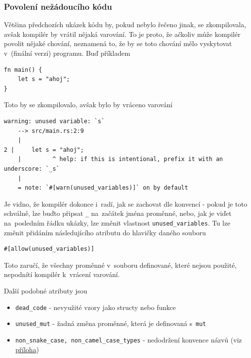 \documentclass[a4paper, 12pt]{article} %
\newcommand{\rust}[1]{\texttt{#1}}
\begin{document}
        \subsubsection*{Povolení nežádoucího kódu}
            Většina předchozích ukázek kódu by, pokud nebylo řečeno jinak, se zkompilovala, avšak kompilér by vrátil nějaká varování. To je proto, že ačkoliv může kompilér povolit nějaké chování, neznamená to, že by se toto chování mělo vyskytovat v~(finální verzi) programu. Buď příkladem
            \begin{verbatim}
fn main() {
    let s = "ahoj";
}
            \end{verbatim}
            
            Toto by se zkompilovalo, avšak bylo by vráceno varování
            \begin{verbatim}
warning: unused variable: `s`
    --> src/main.rs:2:9
    |
2 |     let s = "ahoj";
    |         ^ help: if this is intentional, prefix it with an underscore: `_s`
    |
    = note: `#[warn(unused_variables)]` on by default
            \end{verbatim}
            
            Je vidno, že kompilér dokonce i~radí, jak se zachovat dle konvencí - pokud je toto schválně, lze buďto připsat \rust{_} na~začátek jména proměnné, nebo, jak je viďet na~posledním řádku ukázky, lze změnit vlastnost \rust{unused_variables}. Tu lze změnit přidáním následujícího atributu do hlavičky daného souboru
            \begin{verbatim}
#[allow(unused_variables)]
            \end{verbatim}
            
            Toto zaručí, že všechny proměnné v~souboru definované, které nejsou použité, nepodnítí kompilér k~vrácení varování.
            
            Další podobné atributy jsou
            \begin{itemize}
                \item \rust{dead_code} - nevyužité vzory jako structy nebo funkce
                \item \rust{unused_mut} - žadná změna proměnné, která je definovaná s~\rust{mut}
                \item \rust{non_snake_case, non_camel_case_types} - nedodržení konvence názvů (viz \hyperlink{konvence_nazvu}{příloha})
            \end{itemize}
\end{document}
